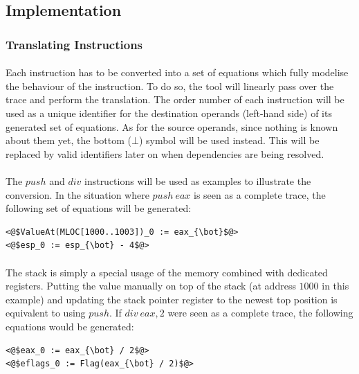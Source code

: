 \subsection{Implementation}
\subsubsection{Translating Instructions} \label{sec:translating_instructions}
\paragraph{}
Each instruction has to be converted into a set of equations which fully modelise the behaviour of the instruction. To do so, the tool will linearly pass over the trace and perform the translation. The order number of each instruction will be used as a unique identifier for the destination operands (left-hand side) of its generated set of equations. As for the source operands, since nothing is known about them yet, the bottom ($\bot$) symbol will be used instead. This will be replaced by valid identifiers later on when dependencies are being resolved.

\paragraph{}
The $push$ and $div$ instructions will be used as examples to illustrate the conversion. In the situation where $push\ eax$ is seen as a complete trace, the following set of equations will be generated: \\
\begin{lstlisting}[frame=tlrb, language={[x86masm]Assembler}]
<@$ValueAt(MLOC[1000..1003])_0 := eax_{\bot}$@>
<@$esp_0 := esp_{\bot} - 4$@>
\end{lstlisting}


\paragraph{}
The stack is simply a special usage of the memory combined with dedicated registers. Putting the value manually on top of the stack (at address $1000$ in this example) and updating the stack pointer register to the newest top position is equivalent to using $push$. If $div\ eax, 2$ were seen as a complete trace, the following equations would be generated: \\
\begin{lstlisting}[frame=tlrb, language={[x86masm]Assembler}]
<@$eax_0 := eax_{\bot} / 2$@>
<@$eflags_0 := Flag(eax_{\bot} / 2)$@>
\end{lstlisting}

